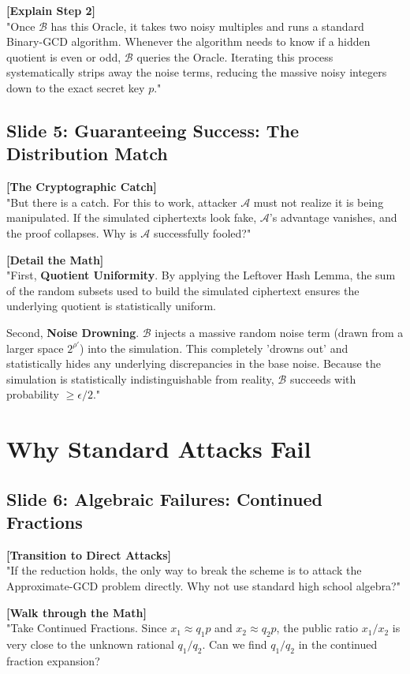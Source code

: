 \documentclass[11pt]{article}
\begin{document}
\textbf{[Explain Step 2]} \\
"Once $\mathcal{B}$ has this Oracle, it takes two noisy multiples and runs a standard Binary-GCD algorithm. Whenever the algorithm needs to know if a hidden quotient is even or odd, $\mathcal{B}$ queries the Oracle. Iterating this process systematically strips away the noise terms, reducing the massive noisy integers down to the exact secret key $p$."

\subsection*{Slide 5: Guaranteeing Success: The Distribution Match}
\textbf{[The Cryptographic Catch]} \\
"But there is a catch. For this to work, attacker $\mathcal{A}$ must not realize it is being manipulated. If the simulated ciphertexts look fake, $\mathcal{A}$'s advantage vanishes, and the proof collapses. Why is $\mathcal{A}$ successfully fooled?"

\textbf{[Detail the Math]} \\
"First, \textbf{Quotient Uniformity}. By applying the Leftover Hash Lemma, the sum of the random subsets used to build the simulated ciphertext ensures the underlying quotient is statistically uniform. 

Second, \textbf{Noise Drowning}. $\mathcal{B}$ injects a massive random noise term (drawn from a larger space $2^{\rho'}$) into the simulation. This completely 'drowns out' and statistically hides any underlying discrepancies in the base noise. Because the simulation is statistically indistinguishable from reality, $\mathcal{B}$ succeeds with probability $\ge \epsilon/2$."

\section{Why Standard Attacks Fail}

\subsection*{Slide 6: Algebraic Failures: Continued Fractions}
\textbf{[Transition to Direct Attacks]} \\
"If the reduction holds, the only way to break the scheme is to attack the Approximate-GCD problem directly. Why not use standard high school algebra?"

\textbf{[Walk through the Math]} \\
"Take Continued Fractions. Since $x_1 \approx q_1 p$ and $x_2 \approx q_2 p$, the public ratio $x_1 / x_2$ is very close to the unknown rational $q_1 / q_2$. Can we find $q_1/q_2$ in the continued fraction expansion?
\end{document}

